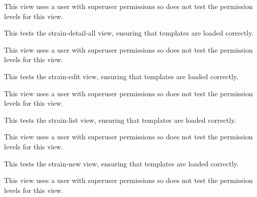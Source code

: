 \documentclass[letterpaper,10pt,english]{sphinxmanual}
\begin{document}
\begin{fulllineitems}
\begin{fulllineitems}
This view uses a user with superuser permissions so does not test the permission levels for this view.

\end{fulllineitems}


\begin{fulllineitems}
\label{api:mousedb.animal.tests.StrainViewTests.test_strain_detail_all}
This tests the strain-detail-all view, ensuring that templates are loaded correctly.

This view uses a user with superuser permissions so does not test the permission levels for this view.

\end{fulllineitems}


\begin{fulllineitems}
\label{api:mousedb.animal.tests.StrainViewTests.test_strain_edit}
This tests the strain-edit view, ensuring that templates are loaded correctly.

This view uses a user with superuser permissions so does not test the permission levels for this view.

\end{fulllineitems}


\begin{fulllineitems}
\label{api:mousedb.animal.tests.StrainViewTests.test_strain_list}
This tests the strain-list view, ensuring that templates are loaded correctly.

This view uses a user with superuser permissions so does not test the permission levels for this view.

\end{fulllineitems}


\begin{fulllineitems}
\label{api:mousedb.animal.tests.StrainViewTests.test_strain_new}
This tests the strain-new view, ensuring that templates are loaded correctly.

This view uses a user with superuser permissions so does not test the permission levels for this view.

\end{fulllineitems}


\end{fulllineitems}
\end{document}
